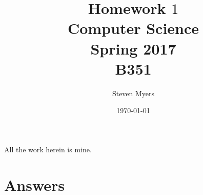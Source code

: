 \documentclass{article}
\begin{document}
\title{Homework $1$\\ Computer Science \\ Spring 2017\\ B351}         %
\author{Steven Myers}        %
\date{\today}          %
\maketitle


\makeatother     %


\pagestyle{plain}
All the work herein is mine.

\section*{Answers}
\end{document}
